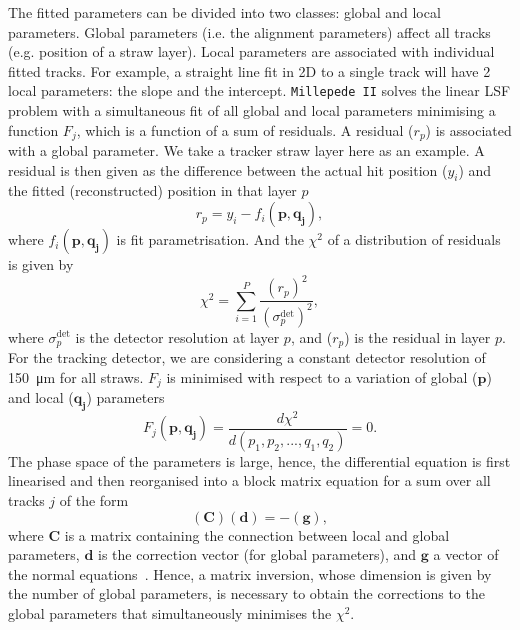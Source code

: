 \documentclass[a4paper,11pt]{article}
\begin{document}
The fitted parameters can be divided into two classes: global and local parameters. Global parameters (i.e. the alignment parameters) affect all tracks (e.g. position of a straw layer). Local parameters are associated with individual fitted tracks. For example, a straight line fit in 2D to a single track will have 2 local parameters: the slope and the intercept. \texttt{Millepede II} solves the linear LSF problem with a simultaneous fit of all global and local parameters minimising a function $F_j$, which is a function of a sum of residuals. A residual ($r_p$) is associated with a global parameter. We take a tracker straw layer here as an example. A residual is then given as the difference between the actual hit position ($y_i$) and the fitted (reconstructed) position in that layer $p$
\begin{equation}
r_p = y_i - f_i(\boldsymbol{p,q_j}),
\end{equation}
where $f_i(\boldsymbol{p,q_j})$ is fit parametrisation. And the $\chi^2$ of a distribution of residuals is given by
\begin{equation}
\chi^2 =\sum_{i=1}^{P}{\frac{(r_p)^2}{(\sigma_p^{\mathrm{det}})^2}},
\end{equation}
where $\sigma_p^{\mathrm{det}}$ is the detector resolution at layer $p$, and ($r_p$) is the residual in layer $p$. For the tracking detector, we are considering a constant detector resolution of \SI{150}{\micro\metre} \cite{g-2_TDR} for all straws. $F_j$ is minimised with respect to a variation of global ($\boldsymbol{p}$) and local ($\boldsymbol{q_j}$) parameters
\begin{equation}
F_j(\boldsymbol{p},\boldsymbol{q_j})=\frac{d\chi^2}{d(p_1, p_2,...,q_1, q_2)}=0.
\end{equation}
The phase space of the parameters is large, hence, the differential equation is first linearised and then reorganised into a block matrix equation \cite{mp2} for a sum over all tracks $j$ of the form
\begin{equation}
\left(\boldsymbol{C}\right)\left(\boldsymbol{d}\right) = - \left(\boldsymbol{g}\right),
\end{equation}
where $\boldsymbol{C}$ is a matrix containing the connection between local and global parameters, $\boldsymbol{d}$ is the correction vector (for global parameters), and $\boldsymbol{g}$ a vector of the normal equations~\cite{mp2}. Hence, a matrix inversion, whose dimension is given by the number of global parameters, is necessary to obtain the corrections to the global parameters that simultaneously minimises the $\chi^2$.
\end{document}
